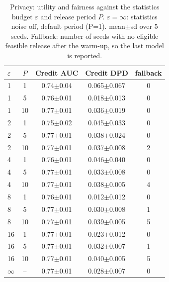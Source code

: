\begin{table}[tbp]
\centering
\footnotesize
\caption{Privacy: utility and fairness against the statistics budget $\varepsilon$ and release period $P$. $\varepsilon=\infty$: statistics noise off, default period (P=1). mean$\pm$sd over 5 seeds. Fallback: number of seeds with no eligible feasible release after the warm-up, so the last model is reported.}
\label{tab:e5_credit}
\setlength{\tabcolsep}{3pt}
\begin{tabular}{lcccc}
\toprule
$\varepsilon$ & $P$ & Credit AUC & Credit DPD & fallback \\
\midrule
1 & 1 & 0.74$\pm$0.04 & 0.065$\pm$0.067 & 0 \\
1 & 5 & 0.76$\pm$0.01 & 0.018$\pm$0.013 & 0 \\
1 & 10 & 0.77$\pm$0.01 & 0.036$\pm$0.019 & 0 \\
2 & 1 & 0.75$\pm$0.02 & 0.045$\pm$0.033 & 0 \\
2 & 5 & 0.77$\pm$0.01 & 0.038$\pm$0.024 & 0 \\
2 & 10 & 0.77$\pm$0.01 & 0.037$\pm$0.008 & 2 \\
4 & 1 & 0.76$\pm$0.01 & 0.046$\pm$0.040 & 0 \\
4 & 5 & 0.77$\pm$0.01 & 0.033$\pm$0.008 & 0 \\
4 & 10 & 0.77$\pm$0.01 & 0.038$\pm$0.005 & 4 \\
8 & 1 & 0.76$\pm$0.01 & 0.012$\pm$0.012 & 0 \\
8 & 5 & 0.77$\pm$0.01 & 0.030$\pm$0.008 & 1 \\
8 & 10 & 0.77$\pm$0.01 & 0.039$\pm$0.005 & 5 \\
16 & 1 & 0.77$\pm$0.01 & 0.023$\pm$0.012 & 0 \\
16 & 5 & 0.77$\pm$0.01 & 0.032$\pm$0.007 & 1 \\
16 & 10 & 0.77$\pm$0.01 & 0.040$\pm$0.005 & 5 \\
$\infty$ & -- & 0.77$\pm$0.01 & 0.028$\pm$0.007 & 0 \\
\bottomrule
\end{tabular}
\end{table}

